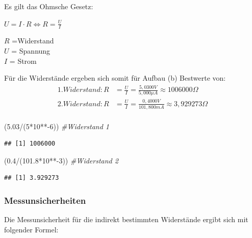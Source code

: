 \documentclass[
  9pt,
]{article}
\newenvironment{Shaded}{\begin{snugshade}}{\end{snugshade}}
\newcommand{\CommentTok}[1]{\textcolor[rgb]{0.56,0.35,0.01}{\textit{#1}}}
\newcommand{\DecValTok}[1]{\textcolor[rgb]{0.00,0.00,0.81}{#1}}
\newcommand{\FloatTok}[1]{\textcolor[rgb]{0.00,0.00,0.81}{#1}}
\newcommand{\NormalTok}[1]{#1}
\newcommand{\SpecialCharTok}[1]{\textcolor[rgb]{0.00,0.00,0.00}{#1}}
\begin{document}
Es gilt das Ohmsche Gesetz:

\(U=I\cdot R \Leftrightarrow R = \frac{U}{I}\)

\noindent \(R\) =Widerstand\\
\noindent \(U\) = Spannung\\
\noindent \(I\) = Strom

Für die Widerstände ergeben sich somit für Aufbau (b) Bestwerte von:
\begin{equation*}
\begin{split}
1. Widerstand: R&=\frac{U}{I} = \frac {5,0300V}{5,000 \mu A} \approx 1006000 \Omega \\
2.Widerstand: R&=\frac{U}{I} = \frac {0,4000V}{101,800 mA} \approx 3,929273 \Omega \\
\end{split}
\end{equation*}

\begin{Shaded}
\begin{Highlighting}[]
\NormalTok{(}\FloatTok{5.03}\SpecialCharTok{/}\NormalTok{(}\DecValTok{5}\SpecialCharTok{*}\DecValTok{10}\SpecialCharTok{**{-}}\DecValTok{6}\NormalTok{)) }\CommentTok{\#Widerstand 1}
\end{Highlighting}
\end{Shaded}

\begin{verbatim}
## [1] 1006000
\end{verbatim}

\begin{Shaded}
\begin{Highlighting}[]
\NormalTok{(}\FloatTok{0.4}\SpecialCharTok{/}\NormalTok{(}\FloatTok{101.8}\SpecialCharTok{*}\DecValTok{10}\SpecialCharTok{**{-}}\DecValTok{3}\NormalTok{)) }\CommentTok{\#Widerstand 2}
\end{Highlighting}
\end{Shaded}

\begin{verbatim}
## [1] 3.929273
\end{verbatim}

\hypertarget{messunsicherheiten-3}{%
\subsubsection{Messunsicherheiten}\label{messunsicherheiten-3}}

Die Messunsicherheit für die indirekt bestimmten Widerstände ergibt sich
mit folgender Formel:
\end{document}
